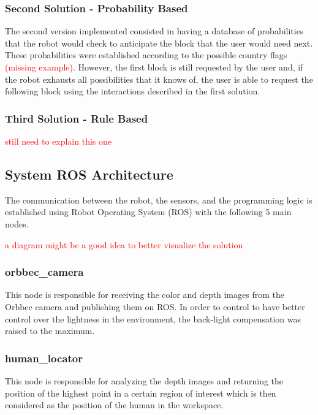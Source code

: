 \subsubsection{Second Solution - Probability Based}

The second version implemented consisted in having a database of probabilities that the robot would check to anticipate the block that the user would need next. These probabilities were established according to the possible country flags \textcolor{red}{(missing example)}. However, the first block is still requested by the user and, if the robot exhausts all possibilities that it knows of, the user is able to request the following block using the interactions described in the first solution.

\subsubsection{Third Solution - Rule Based}

\textcolor{red}{still need to explain this one}

\subsection{System ROS Architecture}

The communication between the robot, the sensors, and the programming logic is established using Robot Operating System (ROS) with the following 5 main nodes.

\textcolor{red}{a diagram might be a good idea to better visualize the solution}

\subsubsection{orbbec\_camera}

This node is responsible for receiving the color and depth images from the Orbbec camera and publishing them on ROS. In order to control to have better control over the lightness in the environment, the back-light compensation was raised to the maximum.

\subsubsection{human\_locator}

This node is responsible for analyzing the depth images and returning the position of the highest point in a certain region of interest which is then considered as the position of the human in the workspace.

